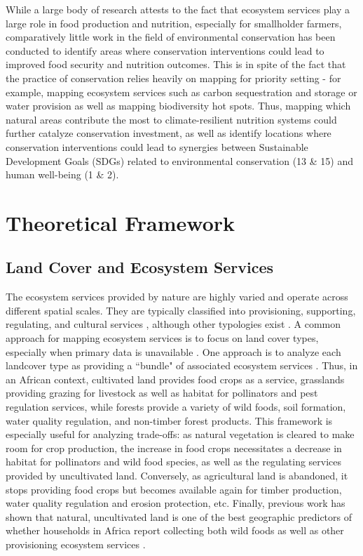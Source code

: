 \documentclass{article}
\begin{document}
While a large body of research attests to the fact that ecosystem services play a large role in food production and nutrition, especially for smallholder farmers, comparatively little work in the field of environmental conservation has been conducted to identify areas where conservation interventions could lead to improved food security and nutrition outcomes.  This is in spite of the fact that the practice of conservation relies heavily on mapping for priority setting - for example, mapping ecosystem services such as carbon sequestration and storage or water provision as well as mapping biodiversity hot spots.  Thus, mapping which natural areas contribute the most to climate-resilient nutrition systems could further catalyze conservation investment, as well as identify locations where conservation interventions could lead to synergies between Sustainable Development Goals (SDGs) related to environmental conservation (13 \& 15) and human well-being (1 \& 2).

\section{Theoretical Framework}

\subsection{Land Cover and Ecosystem Services}
The ecosystem services provided by nature are highly varied and operate across different spatial scales.  They are typically classified into provisioning, supporting, regulating, and cultural services \cite{Martinez-Harms2012}, although other typologies exist \cite{Fisher2008}.  A common approach for mapping ecosystem services is to focus on land cover types, especially when primary data is unavailable \cite{Martinez-Harms2012}.  One approach is to analyze each landcover type as providing a ``bundle" of associated ecosystem services \cite{Raudsepp-Hearne2010}.  Thus, in an African context, cultivated land provides food crops as a service, grasslands providing grazing for livestock as well as habitat for pollinators and pest regulation services, while forests provide a variety of wild foods, soil formation, water quality regulation, and non-timber forest products.  This framework is especially useful for analyzing trade-offs: as natural vegetation is cleared to make room for crop production, the increase in food crops necessitates a decrease in habitat for pollinators and wild food species, as well as the regulating services provided by uncultivated land.  Conversely, as agricultural land is abandoned, it stops providing food crops but becomes available again for timber production, water quality regulation and erosion protection, etc.  Finally, previous work has shown that natural, uncultivated land is one of the best geographic predictors of whether households in Africa report collecting both wild foods as well as other provisioning ecosystem services \cite{Cooper2018a}.
\end{document}

